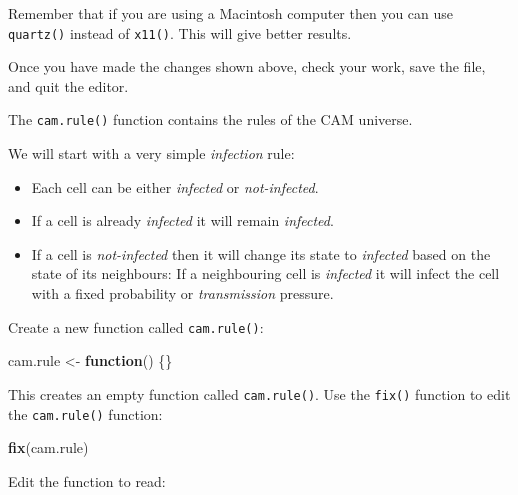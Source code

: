 \documentclass[12pt,a4paper]{book}
\newenvironment{Shaded}{\begin{snugshade}}{\end{snugshade}}
\newcommand{\KeywordTok}[1]{\textcolor[rgb]{0.13,0.29,0.53}{\textbf{#1}}}
\newcommand{\DecValTok}[1]{\textcolor[rgb]{0.00,0.00,0.81}{#1}}
\newcommand{\StringTok}[1]{\textcolor[rgb]{0.31,0.60,0.02}{#1}}
\newcommand{\ControlFlowTok}[1]{\textcolor[rgb]{0.13,0.29,0.53}{\textbf{#1}}}
\newcommand{\OperatorTok}[1]{\textcolor[rgb]{0.81,0.36,0.00}{\textbf{#1}}}
\newcommand{\NormalTok}[1]{#1}
\theoremstyle{definition}
\theoremstyle{definition}
\theoremstyle{definition}
\theoremstyle{remark}
\begin{document}
Remember that if you are using a Macintosh computer then you can use
\texttt{quartz()} instead of \texttt{x11()}. This will give better
results.

Once you have made the changes shown above, check your work, save the
file, and quit the editor.

The \texttt{cam.rule()} function contains the rules of the CAM universe.

We will start with a very simple \emph{infection} rule:

\begin{itemize}
\item
  Each cell can be either \emph{infected} or \emph{not-infected}.
\item
  If a cell is already \emph{infected} it will remain \emph{infected}.
\item
  If a cell is \emph{not-infected} then it will change its state to
  \emph{infected} based on the state of its neighbours: If a
  neighbouring cell is \emph{infected} it will infect the cell with a
  fixed probability or \emph{transmission} pressure.
\end{itemize}

Create a new function called \texttt{cam.rule()}:

\begin{Shaded}
\begin{Highlighting}[]
\NormalTok{cam.rule <-}\StringTok{ }\ControlFlowTok{function}\NormalTok{() \{\}}
\end{Highlighting}
\end{Shaded}

This creates an empty function called \texttt{cam.rule()}. Use the
\texttt{fix()} function to edit the \texttt{cam.rule()} function:

\begin{Shaded}
\begin{Highlighting}[]
\KeywordTok{fix}\NormalTok{(cam.rule)}
\end{Highlighting}
\end{Shaded}

Edit the function to read:

\begin{Shaded}
\end{Shaded}
\end{document}
